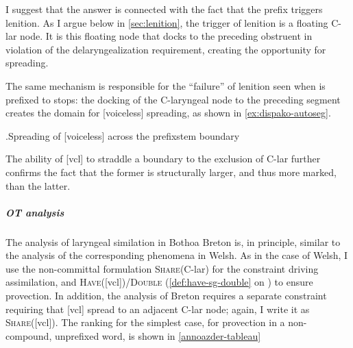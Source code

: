 I suggest that the answer is connected with the fact that the prefix  triggers lenition. As I argue below in \cref{sec:lenition}, the trigger of lenition is a floating C-lar node. It is this floating node that docks to the preceding obstruent in violation of the delaryngealization requirement, creating the opportunity for spreading.

The same mechanism is responsible for the \enquote{failure} of lenition seen when  is prefixed to stops: the docking of the C-laryngeal node to the preceding segment creates the domain for [voiceless] spreading, as shown in \ref{ex:dispako-autoseg}.

\ex.\label{ex:dispako-autoseg}Spreading of [voiceless] across the prefix\endash stem boundary\\

The ability of [vcl] to straddle a boundary to the exclusion of C-lar further confirms the fact that the former is structurally larger, and thus more marked, than the latter.

\subparagraph{OT analysis}
\label{sec:ot-analysis-7}

The analysis of laryngeal similation in Bothoa Breton is, in principle, similar to the analysis of the corresponding phenomena in Welsh. As in the case of Welsh, I use the non\hyp committal formulation \textsc{Share}(C-lar) for the constraint driving assimilation, and \textsc{Have}([vcl])/\textsc{Double} (\cf \cref{def:have-sg-double} on ) to ensure provection. In addition, the analysis of Breton requires a separate constraint requiring that [vcl] spread to an adjacent C-lar node; again, I write it as \textsc{Share}([vcl]). The ranking for the simplest case, \ie for provection in a non-compound, unprefixed word, is shown in \ref{annoazder-tableau}

